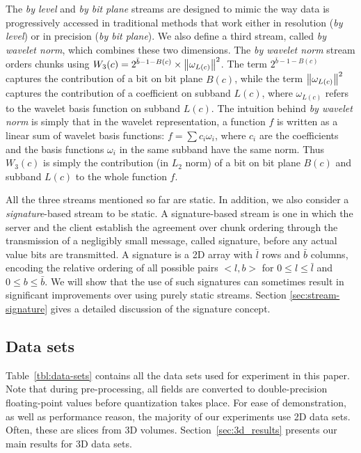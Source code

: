 The \emph{by level} and \emph{by bit plane} streams are designed to mimic the way data is progressively
accessed in traditional methods that work either in resolution (\emph{by level}) or in
precision (\emph{by bit plane}). We also define a third stream, called \emph{by
wavelet norm}, which combines these two dimensions. The \emph{by wavelet norm} stream orders chunks using
$W_3(c)=2^{\bar{b}-1-B(c)}\times \left\lVert\omega_{L(c)}\right\rVert^2$. The term $2^{\bar{b}-1-B(c)}$ captures the
contribution of a bit on bit plane $B(c)$, while the term $\left\lVert\omega_{L(c)}\right\rVert^2$ captures the
contribution of a coefficient on subband $L(c)$, where $\omega_{L(c)}$ refers to the wavelet basis
function on subband $L(c)$. The intuition behind \emph{by wavelet norm} is simply that in the
wavelet representation, a function $f$ is written as a linear sum of wavelet basis functions:
$f=\sum{c_i\omega_i}$, where $c_i$ are the coefficients and the basis functions $\omega_i$ in the
same subband have the same norm. Thus $W_3(c)$ is simply the contribution (in $L_2$ norm) of a bit
on bit plane $B(c)$ and subband $L(c)$ to the whole function $f$.

All the three streams mentioned so far are static. In addition, we also consider a
\emph{signature}-based stream to be static. A signature-based stream is one in which the server and
the client establish the agreement over chunk ordering through the transmission of a negligibly
small message, called signature, before any actual value bits are transmitted. A signature is a 2D
array with $\bar{l}$ rows and $\bar{b}$ columns, encoding the relative ordering of all possible
pairs $<l,b>$ for $0\leq l \leq \bar{l}$ and $0\leq b \leq \bar{b}$. We will show that the use of
such signatures can sometimes result in significant improvements over using purely static streams.
Section \ref{sec:stream-signature} gives a detailed discussion of the signature concept.

\subsection{Data sets}
\label{sec:data-sets}

Table~\ref{tbl:data-sets} contains all the data sets used for experiment in this paper. Note that
during pre-processing, all fields are converted to double-precision floating-point values before
quantization takes place. For ease of demonstration, as well as performance reason, the majority of
our experiments use 2D data sets. Often, these are slices from 3D volumes.
Section~\ref{sec:3d_results} presents our main results for 3D data sets. 

